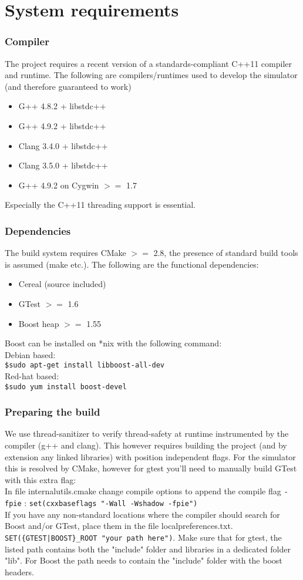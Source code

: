 \section{System requirements}
\subsubsection{Compiler}
The project requires a recent version of a standards-compliant C++11 compiler and runtime. The following are compilers/runtimes used to develop the simulator (and therefore guaranteed to work)
\begin{itemize}
  \item G++ 4.8.2 + libstdc++
  \item G++ 4.9.2 + libstdc++
  \item Clang 3.4.0 + libstdc++
  \item Clang 3.5.0 + libstdc++
  \item G++ 4.9.2 on Cygwin $>=$ 1.7
\end{itemize}
Especially the C++11 threading support is essential.
\subsubsection{Dependencies}
The build system requires CMake $>=$ 2.8, the presence of standard build tools is assumed (make etc.).
The following are the functional dependencies:
\begin{itemize}
  \item Cereal (source included)
  \item GTest $>=$ 1.6
  \item Boost heap $>=$ 1.55  
\end{itemize}
Boost can be installed on *nix with the following command:\\
Debian based:\\
\texttt{\$sudo apt-get install libboost-all-dev}\\
Red-hat based:\\
\texttt{\$sudo yum install boost-devel}\\
\subsubsection{Preparing the build}
We use thread-sanitizer to verify thread-safety at runtime instrumented by the compiler (g++ and clang). This however requires building the project (and by extension any linked libraries) with position independent flags. For the simulator this is resolved by CMake, however for gtest you'll need to manually build GTest with this extra flag:\\
In file internal\textunderscore utils.cmake change compile options to append the compile flag \texttt{-fpie} :
\texttt{set(cxx\textunderscore base\textunderscore flags "-Wall -Wshadow -fpie")}\\
If you have any non-standard locations where the compiler should search for Boost and/or GTest, place them in the file localpreferences.txt.\\
\texttt{SET(\{GTEST|BOOST\}\_ROOT "your path here")}. Make sure that for gtest, the listed path contains both the "include" folder and libraries in a dedicated folder "lib". For Boost the path needs to contain the "include" folder with the boost headers.
